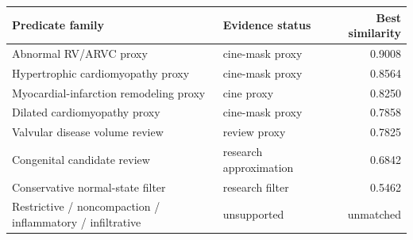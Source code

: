 \setcounter{table}{5}\label{tab:predicate_evidence_alignment}
\begin{tabularx}{\linewidth}{Xlr}
\toprule
Predicate family & Evidence status & Best similarity \\
\midrule
Abnormal RV/ARVC proxy & cine-mask proxy & 0.9008 \\
Hypertrophic cardiomyopathy proxy & cine-mask proxy & 0.8564 \\
Myocardial-infarction remodeling proxy & cine proxy & 0.8250 \\
Dilated cardiomyopathy proxy & cine-mask proxy & 0.7858 \\
Valvular disease volume review & review proxy & 0.7825 \\
Congenital candidate review & research approximation & 0.6842 \\
Conservative normal-state filter & research filter & 0.5462 \\
Restrictive / noncompaction / inflammatory / infiltrative & unsupported & unmatched \\
\bottomrule
\end{tabularx}
